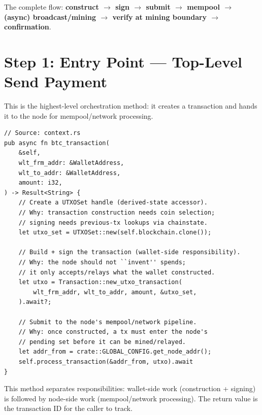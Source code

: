 The complete flow: \textbf{construct \(\to\) sign \(\to\) submit \(\to\) mempool \(\to\) (async) broadcast/mining \(\to\) verify at mining boundary \(\to\) confirmation}.

\section{Step 1: Entry Point --- Top-Level Send Payment}
\label{sec:ch09-5-step1}

This is the highest-level orchestration method: it creates a transaction and hands it to the node for mempool/network processing.

\begin{listing}[htbp]
\caption{ --- send payment entry point}
\label{lst:ch09-5-2}
\begin{verbatim}
// Source: context.rs
pub async fn btc_transaction(
    &self,
    wlt_frm_addr: &WalletAddress,
    wlt_to_addr: &WalletAddress,
    amount: i32,
) -> Result<String> {
    // Create a UTXOSet handle (derived-state accessor).
    // Why: transaction construction needs coin selection;
    // signing needs previous-tx lookups via chainstate.
    let utxo_set = UTXOSet::new(self.blockchain.clone());

    // Build + sign the transaction (wallet-side responsibility).
    // Why: the node should not ``invent'' spends;
    // it only accepts/relays what the wallet constructed.
    let utxo = Transaction::new_utxo_transaction(
        wlt_frm_addr, wlt_to_addr, amount, &utxo_set,
    ).await?;

    // Submit to the node's mempool/network pipeline.
    // Why: once constructed, a tx must enter the node's
    // pending set before it can be mined/relayed.
    let addr_from = crate::GLOBAL_CONFIG.get_node_addr();
    self.process_transaction(&addr_from, utxo).await
}
\end{verbatim}
\end{listing}

\begin{notebox}
This method separates responsibilities: wallet-side work (construction + signing) is followed by node-side work (mempool/network processing). The return value is the transaction ID for the caller to track.
\end{notebox}

